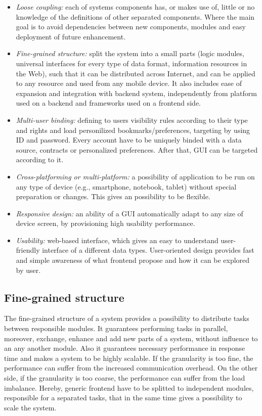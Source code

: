 \begin{itemize}
\item \emph{Loose coupling:} each of systems components has, or makes use of, little or no knowledge of the definitions of other separated components. Where the main goal is to avoid dependencies between new components, modules and easy deployment of future enhancement.
\item \emph{Fine-grained structure:} split the system into a small parts (logic modules, universal interfaces for every type of data format, information resources in the Web), such that it can be distributed across Internet, and can be applied to any resource and used from any mobile device. It also includes ease of expansion and integration with backend system, independently from platform used on a backend and frameworks used on a frontend side.
\item \emph{Multi-user binding:} defining to users visibility rules according to their type and rights and load personilized bookmarks/preferences, targeting by using ID and password. Every account have to be uniquely binded with a data source, contracts or personalized preferences. After that, GUI can be targeted according to it.
\item \emph{Cross-platforming or multi-platform:} a possibility of application to be run on any type of device (e.g., smartphone, notebook, tablet) without special preparation or changes. This gives an possibility to be flexible.
\item \emph{Responsive design:} an ability of a GUI automatically adapt to any size of device screen, by provisioning high usability performance.
\item \emph{Usability:} web-based interface, which gives an easy to understand user-friendly interface of a different data types. User-oriented design provides fast and simple awareness of what frontend propose and how it can be explored by user.
\end{itemize} 

\subsection {Fine-grained structure}
The fine-grained structure of a system provides a possibility to distribute tasks between responsible modules. It guarantees performing tasks in parallel, moreover, exchange, enhance and add new parts of a system, without influence to an any another module. Also it guarantees necessary performance in response time and makes a system to be highly scalable. If the granularity is too fine, the performance can suffer from the increased communication overhead. On the other side, if the granularity is too coarse, the performance can suffer from the load imbalance. Hereby, generic frontend have to be splitted to independent modules, responsible for a separated tasks, that in the same time gives a possibility to scale the system. 

